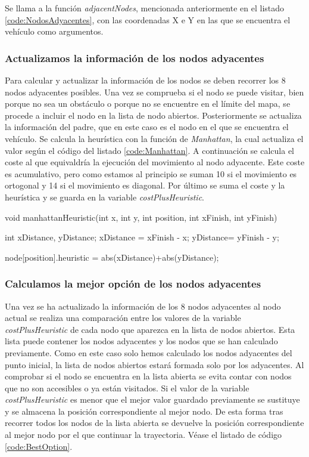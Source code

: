 Se llama a la función \emph{adjacentNodes}, mencionada anteriormente en el listado \ref{code:NodosAdyacentes}, con las coordenadas X e Y en las que se encuentra el vehículo como argumentos.

\subsubsection{Actualizamos la información de los nodos adyacentes}\label{subsec:ActualizarNodosAdyacentes}

Para calcular y actualizar la información de los nodos se deben recorrer los 8 nodos adyacentes posibles. Una vez se comprueba si el nodo se puede visitar, bien porque no sea un obstáculo o porque no se encuentre en el límite del mapa, se procede a incluir el nodo en la lista de nodo abiertos. Posteriormente se actualiza la información del padre, que en este caso es el nodo en el que se encuentra el vehículo. Se calcula la heurística con la función de \emph{Manhattan}, la cual actualiza el valor según el código del listado \ref{code:Manhattan}. A continuación se calcula el coste al que equivaldría la ejecución del movimiento al nodo adyacente. Este coste es acumulativo, pero como estamos al principio se suman 10 si el movimiento es ortogonal y 14 si el movimiento es diagonal. Por último se suma el coste y la heurística y se guarda en la variable \emph{costPlusHeuristic}.

\begin{listing}[
  float=ht,
  language = C++,
  caption  = {Función con la que se calcula la heurística},
  label    = code:Manhattan]
void manhattanHeuristic(int x, int y, int position, int xFinish, int yFinish){
	int xDistance, yDistance;
	xDistance = xFinish - x;
	yDistance= yFinish - y;

	node[position].heuristic = abs(xDistance)+abs(yDistance);
}
\end{listing}

\subsubsection{Calculamos la mejor opción de los nodos adyacentes}\label{subsec:BestOption}

Una vez se ha actualizado la información de los 8 nodos adyacentes al nodo actual se realiza una comparación entre los valores de la variable \emph{costPlusHeuristic} de cada nodo que aparezca en la lista de nodos abiertos. Esta lista puede contener los nodos adyacentes y los nodos que se han calculado previamente. Como en este caso solo hemos calculado los nodos adyacentes del punto inicial, la lista de nodos abiertos estará formada solo por los adyacentes. Al comprobar si el nodo se encuentra en la lista abierta se evita contar con nodos que no son accesibles o ya están visitados. Si el valor de la variable \emph{costPlusHeuristic} es menor que el mejor valor guardado previamente se sustituye y se almacena la posición correspondiente al mejor nodo. De esta forma tras recorrer todos los nodos de la lista abierta se devuelve la posición correspondiente al mejor nodo por el que continuar la trayectoria. Véase el listado de código \ref{code:BestOption}.

